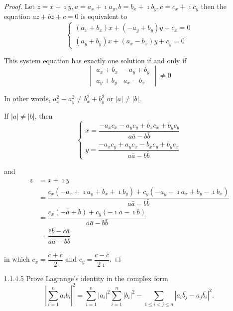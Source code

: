 \begin{proof}
	Let \( z = x + \imath y, a = a_{x} + \imath a_{y}, b = b_{x} + \imath b_{y}, c = c_{x} + \imath c_{y} \) then the equation \( az + b\bar{z} + c = 0 \) is equivalent to
	\[
		\begin{cases}
			(a_{x} + b_{x})x + (-a_{y} + b_{y})y + c_{x} = 0 \\
			(a_{y} + b_{y})x + (a_{x} - b_{x})y + c_{y} = 0
		\end{cases}
	\]

	This system equation has exactly one solution if and only if
	\[
		\begin{vmatrix}
			a_{x} + b_{x} & -a_{y} + b_{y} \\
			a_{y} + b_{y} & a_{x} - b_{x}
		\end{vmatrix} \ne 0
	\]

	In other words, \( a_{x}^{2} + a_{y}^{2} \ne b_{x}^{2} + b_{y}^{2} \) or \( \left\vert a \right\vert \ne \left\vert b \right\vert \).

	If \( \left\vert a \right\vert \ne \left\vert b \right\vert \), then
	\[
		\begin{cases}
			x = \dfrac{-a_{x}c_{x} - a_{y}c_{y} + b_{x}c_{x} + b_{y}c_{y}}{a\bar{a} - b\bar{b}} \\
			y = \dfrac{-a_{x}c_{y} + a_{y}c_{x} - b_{x}c_{y} + b_{y}c_{x}}{a\bar{a} - b\bar{b}}
		\end{cases}
	\]

	and
	\begingroup
	\allowdisplaybreaks%
	\begin{align*}
		z & = x + \imath y                                                                                                                           \\
		  & = \dfrac{c_{x}(-a_{x} + \imath a_{y} + b_{x} + \imath b_{y}) + c_{y}(-a_{y} - \imath a_{x} + b_{y} - \imath b_{x})}{a\bar{a} - b\bar{b}} \\
		  & = \dfrac{c_{x}(-\bar{a} + b) + c_{y}(-\imath\bar{a} - \imath b)}{a\bar{a} - b\bar{b}}                                                    \\
		  & = \dfrac{\bar{c}b - c\bar{a}}{a\bar{a} - b\bar{b}}
	\end{align*}
	\endgroup

	in which \( c_{x} = \dfrac{c + \bar{c}}{2} \) and \( c_{y} = \dfrac{c - \bar{c}}{2\imath} \).
\end{proof}

\begin{problem}{1.1.4.5}
Prove Lagrange's identity in the complex form
\[
	{\left\vert \sum^{n}_{i=1} a_{i}b_{i} \right\vert}^{2} = \sum^{n}_{i=1} {\left\vert a_{i} \right\vert}^{2} \sum^{n}_{i=1} {\left\vert b_{i} \right\vert}^{2} - \sum_{1\le i < j \le n} {\left\vert a_{i}\overline{b_{j}} - a_{j}\overline{b_{i}} \right\vert}^{2}.
\]
\end{problem}

